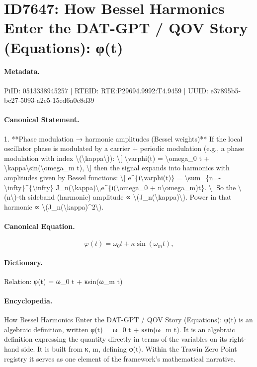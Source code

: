 \section*{ID7647: How Bessel Harmonics Enter the DAT-GPT / QOV Story (Equations): φ(t)}
\paragraph{Metadata.}
PiID: 0513338945257 | RTEID: RTE:P29694.9992:T4.9459 | UUID: e37895b5-bc27-5093-a2e5-15ed6a0c8d39

\paragraph{Canonical Statement.}
1. **Phase modulation → harmonic amplitudes (Bessel weights)** If the local oscillator phase is modulated by a carrier + periodic modulation (e.g., a phase modulation with index \textbackslash{}(\textbackslash{}kappa\textbackslash{})): \textbackslash{}[ \textbackslash{}varphi(t) = \textbackslash{}omega\_0 t + \textbackslash{}kappa\textbackslash{}sin(\textbackslash{}omega\_m t), \textbackslash{}] then the signal expands into harmonics with amplitudes given by Bessel functions: \textbackslash{}[ e\textasciicircum{}\{i\textbackslash{}varphi(t)\} = \textbackslash{}sum\_\{n=-\textbackslash{}infty\}\textasciicircum{}\{\textbackslash{}infty\} J\_n(\textbackslash{}kappa)\textbackslash{},e\textasciicircum{}\{i(\textbackslash{}omega\_0 + n\textbackslash{}omega\_m)t\}. \textbackslash{}] So the \textbackslash{}(n\textbackslash{})-th sideband (harmonic) amplitude ∝ \textbackslash{}(J\_n(\textbackslash{}kappa)\textbackslash{}). Power in that harmonic ∝ \textbackslash{}(J\_n(\textbackslash{}kappa)\textasciicircum{}2\textbackslash{}).

\paragraph{Canonical Equation.}
\[
\varphi(t) = \omega_0 t + \kappa\sin(\omega_m t),
\]

\paragraph{Dictionary.}
Relation: φ(t) = ω\_0 t + κsin(ω\_m t)

\paragraph{Encyclopedia.}
How Bessel Harmonics Enter the DAT-GPT / QOV Story (Equations): φ(t) is an algebraic definition, written φ(t) = ω\_0 t + κsin(ω\_m t). It is an algebraic definition expressing the quantity directly in terms of the variables on its right-hand side. It is built from κ, m, defining φ(t). Within the Trawin Zero Point registry it serves as one element of the framework's mathematical narrative.
